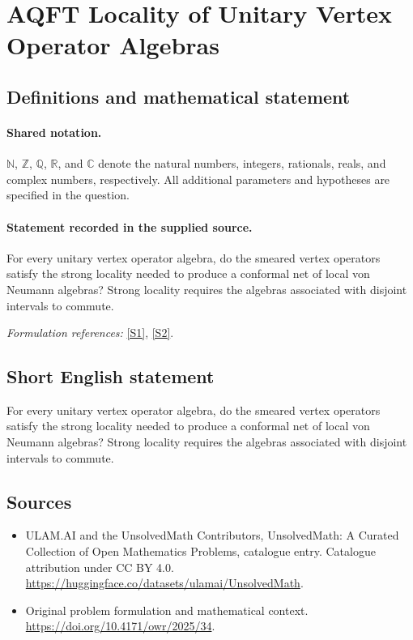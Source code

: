 \documentclass[11pt]{article}
\newcommand{\sref}[2]{\hyperlink{source:#1:#2}{[S#2]}}
\begin{document}
\section{AQFT Locality of Unitary Vertex Operator Algebras}\label{statement}

\subsection{Definitions and mathematical statement}

\paragraph{Shared notation.}$\mathbb N$, $\mathbb Z$, $\mathbb Q$, $\mathbb R$, and $\mathbb C$ denote the natural numbers, integers, rationals, reals, and complex numbers, respectively. All additional parameters and hypotheses are specified in the question.


\paragraph{Statement recorded in the supplied source.}
For every unitary vertex operator algebra, do the smeared vertex operators satisfy the strong locality needed to produce a conformal net of local von Neumann algebras? Strong locality requires the algebras associated with disjoint intervals to commute.
\par\smallskip\textit{Formulation references:} \sref{statement}{1}, \sref{statement}{2}.
\subsection{Short English statement}
For every unitary vertex operator algebra, do the smeared vertex operators satisfy the strong locality needed to produce a conformal net of local von Neumann algebras? Strong locality requires the algebras associated with disjoint intervals to commute.
\subsection{Sources}
\begin{itemize}
\item[\hypertarget{source:statement:1}{S1}] ULAM.AI and the UnsolvedMath Contributors, UnsolvedMath: A Curated Collection of Open Mathematics Problems, catalogue entry. Catalogue attribution under CC BY 4.0.
\url{https://huggingface.co/datasets/ulamai/UnsolvedMath}.
\item[\hypertarget{source:statement:2}{S2}] Original problem formulation and mathematical context.
\url{https://doi.org/10.4171/owr/2025/34}.
\end{itemize}
\label{end:statement}
\end{document}
